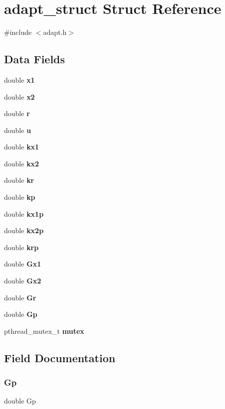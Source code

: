 \section{adapt\+\_\+struct Struct Reference}
\label{structadapt__struct}


{\ttfamily \#include $<$adapt.\+h$>$}

\subsection*{Data Fields}
\begin{DoxyCompactItemize}
\item 
double \textbf{ x1}
\item 
double \textbf{ x2}
\item 
double \textbf{ r}
\item 
double \textbf{ u}
\item 
double \textbf{ kx1}
\item 
double \textbf{ kx2}
\item 
double \textbf{ kr}
\item 
double \textbf{ kp}
\item 
double \textbf{ kx1p}
\item 
double \textbf{ kx2p}
\item 
double \textbf{ krp}
\item 
double \textbf{ Gx1}
\item 
double \textbf{ Gx2}
\item 
double \textbf{ Gr}
\item 
double \textbf{ Gp}
\item 
pthread\+\_\+mutex\+\_\+t \textbf{ mutex}
\end{DoxyCompactItemize}


\subsection{Field Documentation}
\mbox{\label{structadapt__struct_af79db53f2f759507815291d8bce30f87}} 
\subsubsection{Gp}
{\footnotesize\ttfamily double Gp}

\mbox{\label{structadapt__struct_aadf777b6408d35276d490eac8106ac66}} 
